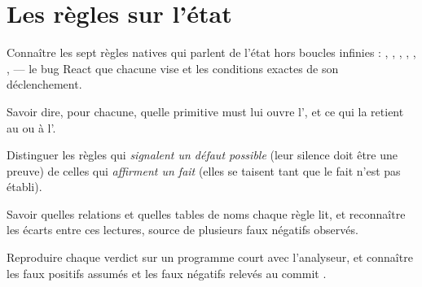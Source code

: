 \chapter{Les règles sur l'état}
\label{chap:regles-etat}

\begin{objectifs}
  \item Connaître les sept règles natives qui parlent de l'état  hors boucles infinies : , , , , , ,  --- le bug React que chacune vise et les conditions exactes de son déclenchement.
  \item Savoir dire, pour chacune, quelle primitive must lui ouvre l'\Error{}, et ce qui la retient au \Warning{} ou à l'\Info.
  \item Distinguer les règles qui \emph{signalent un défaut possible} (leur silence doit être une preuve) de celles qui \emph{affirment un fait} (elles se taisent tant que le fait n'est pas établi).
  \item Savoir quelles relations et quelles tables de noms chaque règle lit, et reconnaître les écarts entre ces lectures, source de plusieurs faux négatifs observés.
  \item Reproduire chaque verdict sur un programme court avec l'analyseur, et connaître les faux positifs assumés et les faux négatifs relevés au commit \snapshotCommit.
\end{objectifs}


